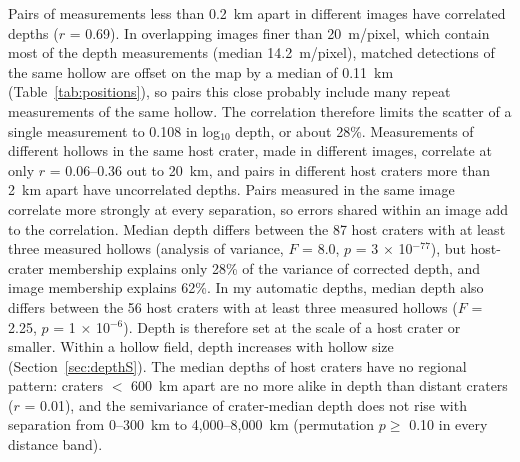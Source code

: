 \documentclass{planetary}
\begin{document}
Pairs of measurements less than 0.2~km apart in different images have correlated depths ($r$ = 0.69). In overlapping images finer than 20~m/pixel, which contain most of the depth measurements (median 14.2~m/pixel), matched detections of the same hollow are offset on the map by a median of 0.11~km (Table~\ref{tab:positions}), so pairs this close probably include many repeat measurements of the same hollow. The correlation therefore limits the scatter of a single measurement to 0.108 in log$_{10}$ depth, or about 28\%. Measurements of different hollows in the same host crater, made in different images, correlate at only $r$ = 0.06--0.36 out to 20~km, and pairs in different host craters more than 2~km apart have uncorrelated depths. Pairs measured in the same image correlate more strongly at every separation, so errors shared within an image add to the correlation. Median depth differs between the 87 host craters with at least three measured hollows (analysis of variance, $F$ = 8.0, $p$ = 3 $\times$ 10$^{-77}$), but host-crater membership explains only 28\% of the variance of corrected depth, and image membership explains 62\%. In my automatic depths, median depth also differs between the 56 host craters with at least three measured hollows ($F$ = 2.25, $p$ = 1 $\times$ 10$^{-6}$). Depth is therefore set at the scale of a host crater or smaller. Within a hollow field, depth increases with hollow size (Section~\ref{sec:depthS}). The median depths of host craters have no regional pattern: craters $<$ 600~km apart are no more alike in depth than distant craters ($r$ = 0.01), and the semivariance of crater-median depth does not rise with separation from 0--300~km to 4,000--8,000~km (permutation $p \geq$ 0.10 in every distance band).
\end{document}
